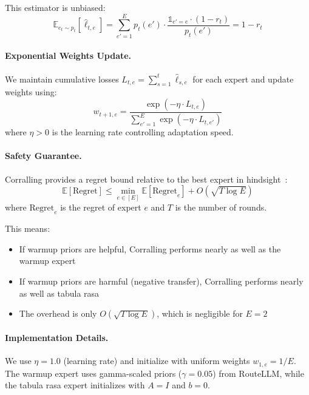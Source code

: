 This estimator is unbiased:
\begin{equation}
\mathbb{E}_{e_t \sim p_t}[\hat{\ell}_{t,e}] 
= \sum_{e'=1}^{E} p_t(e') \cdot \frac{\mathbb{1}_{e'=e} \cdot (1-r_t)}{p_t(e')} 
= 1 - r_t
\end{equation}

\paragraph{Exponential Weights Update.}
We maintain cumulative losses $L_{t,e} = \sum_{s=1}^{t} \hat{\ell}_{s,e}$ for each expert and update weights using:
\begin{equation}
w_{t+1,e} = \frac{\exp(-\eta \cdot L_{t,e})}{\sum_{e'=1}^{E} \exp(-\eta \cdot L_{t,e'})}
\label{eq:exponential_weights}
\end{equation}
where $\eta > 0$ is the learning rate controlling adaptation speed.

\paragraph{Safety Guarantee.}
Corralling provides a regret bound relative to the best expert in hindsight~\cite{agarwal2017corralling}:
\begin{equation}
\mathbb{E}[\text{Regret}] \leq \min_{e \in [E]} \mathbb{E}[\text{Regret}_e] + O\left(\sqrt{T \log E}\right)
\end{equation}
where $\text{Regret}_e$ is the regret of expert $e$ and $T$ is the number of rounds.

This means:
\begin{itemize}[nosep]
    \item If warmup priors are helpful, Corralling performs nearly as well as the warmup expert
    \item If warmup priors are harmful (negative transfer), Corralling performs nearly as well as tabula rasa
    \item The overhead is only $O(\sqrt{T \log E})$, which is negligible for $E=2$
\end{itemize}

\paragraph{Implementation Details.}
We use $\eta = 1.0$ (learning rate) and initialize with uniform weights $w_{1,e} = 1/E$.
The warmup expert uses gamma-scaled priors ($\gamma = 0.05$) from RouteLLM, while the tabula rasa expert initializes with $A = I$ and $b = 0$.

